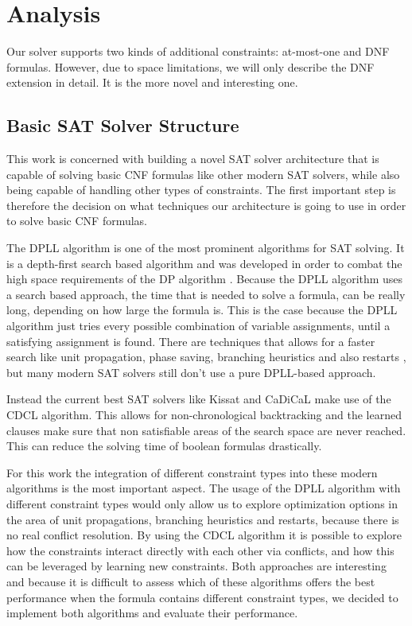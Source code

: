 \documentclass{easychair}
\begin{document}
\section{Analysis}
\label{ch:Analysis}
Our solver supports two kinds of additional constraints: at-most-one and DNF formulas. However, due to
space limitations, we will only describe the DNF extension in detail. It is the more novel and interesting one.

\subsection{Basic SAT Solver Structure}

This work is concerned with building a novel SAT solver architecture that is capable of solving basic CNF formulas like other modern SAT solvers, while also being capable of handling other types of constraints. The first important step is therefore the decision on what techniques our architecture is going to use in order to solve basic CNF formulas.

The DPLL algorithm is one of the most prominent algorithms for SAT solving. It is a depth-first search based algorithm and was developed in order to combat the high space requirements of the DP algorithm \cite{biere2009handbook}. Because the DPLL algorithm uses a search based approach, the time that is needed to solve a formula, can be really long, depending on how large the formula is. This is the case because the DPLL algorithm just tries every possible combination of variable assignments, until a satisfying assignment is found. There are techniques that allows for a faster search like unit propagation, phase saving, branching heuristics and also restarts \cite{biere2009handbook}, but many modern SAT solvers still don't use a pure DPLL-based approach.

Instead the current best SAT solvers like Kissat \cite{BiereFazekasFleuryHeisinger-SAT-Competition-2020-solvers} and CaDiCaL \cite{Biere-SAT-Competition-2017-solvers} make use of the CDCL algorithm. This allows for non-chronological backtracking and the learned clauses make sure that non satisfiable areas of the search space are never reached. This can reduce the solving time of boolean formulas drastically. 

For this work the integration of different constraint types into these modern algorithms is the most important aspect. The usage of the DPLL algorithm with different constraint types would only allow us to explore optimization options in the area of unit propagations, branching heuristics and restarts, because there is no real conflict resolution. By using the CDCL algorithm it is possible to explore how the constraints interact directly with each other via conflicts, and how this can be leveraged by learning new constraints. Both approaches are interesting and because it is difficult to assess which of these algorithms offers the best performance when the formula contains different constraint types, we decided to implement both algorithms and evaluate their performance.
\end{document}
